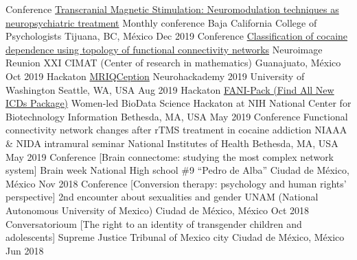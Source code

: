 \begin{cvproceedings}
    \cvproceeding
        {Conference}
        {\href{https://soffiafdz.github.io/slides/EMTr.html}{Transcranial Magnetic Stimulation: Neuromodulation techniques as neuropsychiatric treatment}}
        {Monthly conference}
        {Baja California College of Psychologists}
        {Tijuana, BC, México}
        {Dec 2019}
    \cvproceeding
        {Conference}
        {\href{https://soffiafdz.github.io/slides/neuroimagenXXI.html}{Classification of cocaine dependence using topology of functional connectivity networks}}
        {Neuroimage Reunion XXI}
        {CIMAT (Center of research in mathematics)}
        {Guanajuato, México}
        {Oct 2019}
    \cvproceeding
        {Hackaton}
        {\href{https://github.com/elizabethbeard/mriqception}{MRIQCeption}}
        {Neurohackademy 2019}
        {University of Washington}
        {Seattle, WA, USA}
        {Aug 2019}
    \cvproceeding
        {Hackaton}
        {\href{https://github.com/NCBI-Hackathons/Design-of-ICD-9-to-10-conversion-function-for-the-R-package-icd}{FANI-Pack (Find All New ICDs Package)}}
        {Women-led BioData Science Hackaton at NIH}
        {National Center for Biotechnology Information}
        {Bethesda, MA, USA}
        {May 2019}
    \cvproceeding
        {Conference}
        {Functional connectivity network changes after rTMS treatment in cocaine addiction}
        {NIAAA \& NIDA intramural seminar}
        {National Institutes of Health}
        {Bethesda, MA, USA}
        {May 2019}
    \cvproceeding
        {Conference}
        {[Brain connectome: studying the most complex network system]}
        {Brain week}
        {National High school \#9 ``Pedro de Alba''}
        {Ciudad de México, México}
        {Nov 2018}
    \cvproceeding
        {Conference}
        {[Conversion therapy: psychology and human rights' perspective]}
        {2nd encounter about sexualities and gender}
        {UNAM (National Autonomous University of Mexico)}
        {Ciudad de México, México}
        {Oct 2018}
    \cvproceeding
        {Conversatorioum}
        {[The right to an identity of transgender children and adolescents]}
        {}
        {Supreme Justice Tribunal of Mexico city}
        {Ciudad de México, México}
        {Jun 2018}
\end{cvproceedings}
